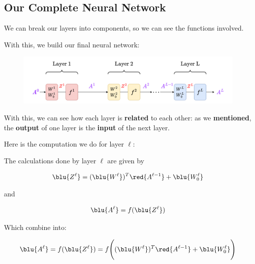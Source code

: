     \subsection{Our Complete Neural Network}
    
        We can break our layers into components, so we can see the functions involved. 
        
        With this, we build our final neural network:
        
        \begin{figure}[H]
            \centering
            \includegraphics[width=140mm,scale=0.4]{images/nn_images/final_neural_network.png}
        \end{figure}
        
        With this, we can see how each layer is \textbf{related} to each other: as we \textbf{mentioned}, the \textbf{output} of one layer is the \textbf{input} of the next layer.
        
        Here is the computation we do for layer $\ell$:\\
        
        \begin{kequation}
            The calculations done by layer $\ell$ are given by
            
            \begin{equation*}
                \blu{Z^\ell} = (\blu{W^\ell})^T \red{A^{\ell-1}} + \blu{W_0^\ell} 
            \end{equation*}
            
            and
            
            \begin{equation*}
                \blu{A^\ell} = f(\blu{Z^\ell})
            \end{equation*}
            
            Which combine into:
            
            \begin{equation*}
                \blu{A^\ell} = f(\blu{Z^\ell}) = 
                f  
                \Bigg( 
                    (\blu{W^\ell})^T \red{A^{\ell-1}} + \blu{W_0^\ell} 
                \Bigg)
            \end{equation*}
        \end{kequation}
        
